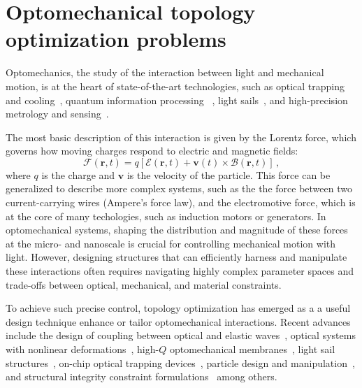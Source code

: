 \chapter{Optomechanical topology optimization problems}
Optomechanics, the study of the interaction between light and mechanical motion, is at the heart of state-of-the-art technologies, such as 
optical trapping~\cite{ashkin_acceleration_1970, moffitt_recent_2008} and cooling~\cite{cooling}, quantum information processing~\cite{Andrews_2014, Xi_2025}
, light sails~\cite{lightsail, lightsail1}, and high-precision metrology and sensing~\cite{sensing, weakforce, Li:18, Mason_2019}.

The most basic description of this interaction is given by the Lorentz force, which governs how moving charges respond to electric and magnetic fields:
\begin{equation}\label{eq:lorentz_f}
    \mathbf{\bm{\mathcal{F}}}(\mathbf{r},t) = q \left[ \bm{\mathcal{E}}(\mathbf{r},t) + \mathbf{v}(t) \times \bm{\mathcal{B}}(\mathbf{r},t) \right]\,,
\end{equation}
where $q$ is the charge and $\mathbf{v}$ is the velocity of the particle. This force can be generalized to describe more complex systems,
such as the the force between two current-carrying 
wires (Ampere's force law), and the electromotive force, which is at the core of many techologies, such as induction motors or generators.
In optomechanical systems, shaping the distribution and magnitude of these forces at the micro- and nanoscale is crucial for controlling mechanical motion with light. 
However, designing structures that can efficiently harness and manipulate these interactions often requires navigating highly complex
 parameter spaces and trade-offs between optical, mechanical, and material constraints.

To achieve such precise control, topology optimization has emerged as a a useful design technique enhance or tailor optomechanical interactions.
Recent advances include the design of coupling between optical and elastic
 waves~\cite{photo_topopt}, optical systems with nonlinear deformations~\cite{def_wg}, high-$Q$ optomechanical membranes~\cite{highQ1, fengwen, aragon1},
light sail structures~\cite{lightsail_topopt, lightsail_topopt1},
on-chip optical trapping devices~\cite{ownpub1}, particle design and manipulation~\cite{ownpub2, particle_opt},
and structural integrity constraint formulations~\cite{structural_integrity}
 among others.

